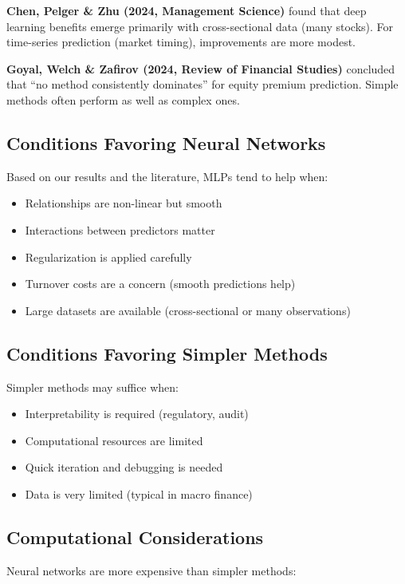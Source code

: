 \documentclass[11pt,a4paper]{article}
\begin{document}
\textbf{Chen, Pelger \& Zhu (2024, Management Science)} found that deep learning benefits emerge primarily with cross-sectional data (many stocks). For time-series prediction (market timing), improvements are more modest.

\textbf{Goyal, Welch \& Zafirov (2024, Review of Financial Studies)} concluded that ``no method consistently dominates'' for equity premium prediction. Simple methods often perform as well as complex ones.

\subsection{Conditions Favoring Neural Networks}

Based on our results and the literature, MLPs tend to help when:
\begin{itemize}
    \item Relationships are non-linear but smooth
    \item Interactions between predictors matter
    \item Regularization is applied carefully
    \item Turnover costs are a concern (smooth predictions help)
    \item Large datasets are available (cross-sectional or many observations)
\end{itemize}

\subsection{Conditions Favoring Simpler Methods}

Simpler methods may suffice when:
\begin{itemize}
    \item Interpretability is required (regulatory, audit)
    \item Computational resources are limited
    \item Quick iteration and debugging is needed
    \item Data is very limited (typical in macro finance)
\end{itemize}

\subsection{Computational Considerations}

Neural networks are more expensive than simpler methods:
\end{document}

